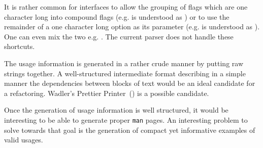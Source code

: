 \documentclass[preprint,9pt]{sigplanconf}
\begin{document}
It is rather common for interfaces to allow the grouping of
flags which are one character long into compound flags (e.g.
 is understood as )
or to use the remainder of a one character long option as
its parameter (e.g.  is understood as
). One can even mix the two e.g.
. The current parser does not handle
these shortcuts.

The usage information is generated in a rather crude manner
by putting raw strings together. A well-structured intermediate
format describing in a simple manner the dependencies between
blocks of text would be an ideal candidate for a refactoring.
Wadler's Prettier Printer~(\citeyear{wadler2003prettier}) is a
possible candidate.

Once the generation of usage information is well structured,
it would be interesting to be able to generate proper \texttt{man}
pages. An interesting problem to solve towards that goal is the
generation of compact yet informative examples of valid usages.



\end{document}
